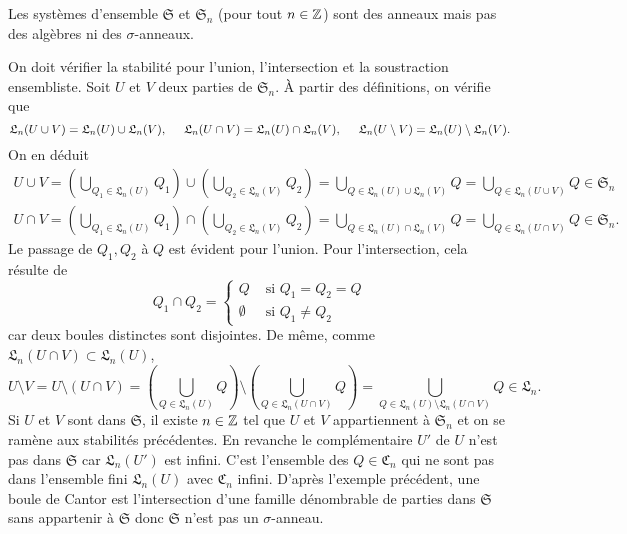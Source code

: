\begin{prop}
Les systèmes d'ensemble $\mathfrak{S}$ et $\mathfrak{S}_n$ (pour tout $n\in \mathbb{Z}$) sont des anneaux mais pas des algèbres ni des $\sigma$-anneaux.
\end{prop}
\begin{demo}
On doit vérifier la stabilité pour l'union, l'intersection et la soustraction ensembliste. Soit $U$ et $V$ deux parties de $\mathfrak{S}_n$. À partir des définitions, on vérifie que
\begin{displaymath}
 \mathfrak{L}_n(U \cup V ) = \mathfrak{L}_n(U ) \cup \mathfrak{L}_n(V), \hspace{0.5cm}
 \mathfrak{L}_n(U \cap V ) = \mathfrak{L}_n(U ) \cap \mathfrak{L}_n(V), \hspace{0.5cm}
 \mathfrak{L}_n(U \setminus V ) = \mathfrak{L}_n(U ) \setminus \mathfrak{L}_n(V).
\end{displaymath}
On en déduit
\begin{align*}
 U \cup V   = \left(\bigcup_{Q_1 \in \mathfrak{L}_n(U)}Q_1\right) \cup \left(\bigcup_{Q_2 \in \mathfrak{L}_n(V)}Q_2\right)
            = \bigcup_{Q \in \mathfrak{L}_n(U) \cup \mathfrak{L}_n(V)}Q = \bigcup_{Q \in \mathfrak{L}_n(U \cup V )}Q \in \mathfrak{S}_n \\
 U \cap V   = \left(\bigcup_{Q_1 \in \mathfrak{L}_n(U)}Q_1\right) \cap \left(\bigcup_{Q_2 \in \mathfrak{L}_n(V)}Q_2\right)
            = \bigcup_{Q \in \mathfrak{L}_n(U) \cap \mathfrak{L}_n(V)}Q = \bigcup_{Q \in \mathfrak{L}_n(U \cap V )}Q \in \mathfrak{S}_n.
\end{align*}
Le passage de $Q_1, Q_2$ à $Q$ est évident pour l'union. Pour l'intersection, cela résulte de
\begin{displaymath}
 Q_1 \cap Q_2 =
 \left\lbrace
   \begin{aligned}
    Q &\text{ si } Q_1 = Q_2 = Q \\
    \emptyset &\text{ si } Q_1 \neq Q_2
   \end{aligned}
  \right.
\end{displaymath}
car deux boules distinctes sont disjointes. De même, comme $\mathfrak{L}_n(U \cap V ) \subset \mathfrak{L}_n(U)$,
\begin{displaymath}
 U \setminus V = U \setminus (U \cap V) = \left(\bigcup_{Q \in \mathfrak{L}_n(U)}Q\right) \setminus \left(\bigcup_{Q \in \mathfrak{L}_n(U \cap V) }Q\right)
 = \bigcup_{Q \in \mathfrak{L}_n(U) \setminus \mathfrak{L}_n(U \cap V) }Q
 \in \mathfrak{L}_n.
\end{displaymath}
Si $U$ et $V$ sont dans $\mathfrak{S}$, il existe $n\in \mathbb{Z}$ tel que $U$ et $V$ appartiennent à $\mathfrak{S}_n$ et on se ramène aux stabilités précédentes.\newline
En revanche le complémentaire $U'$ de $U$ n'est pas dans $\mathfrak{S}$ car $\mathfrak{L}_n(U')$ est infini. C'est l'ensemble des $Q \in \mathfrak{C}_n$ qui ne sont pas dans l'ensemble fini $\mathfrak{L}_n(U)$ avec $\mathfrak{C}_n$ infini.\newline
D'après l'exemple précédent, une boule de Cantor est l'intersection d'une famille dénombrable de parties dans $\mathfrak{S}$ sans appartenir à $\mathfrak{S}$ donc $\mathfrak{S}$ n'est pas un $\sigma$-anneau.
\end{demo}

